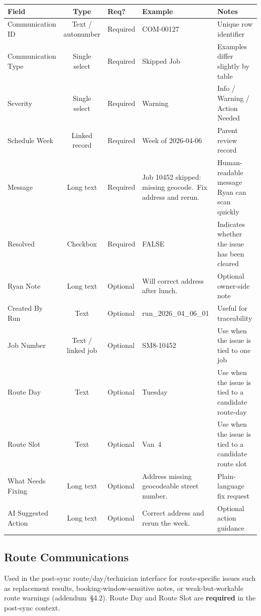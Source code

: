 \documentclass[12pt]{article}
\begin{document}
\medskip
{\small
\begin{longtable}{lclp{2.8cm}p{3.2cm}}
\toprule
\textbf{Field} & \textbf{Type} & \textbf{Req?} & \textbf{Example} & \textbf{Notes} \\
\midrule
Communication ID   & Text / autonumber & Required & COM-00127 & Unique row identifier \\
Communication Type & Single select    & Required & Skipped Job & Examples differ slightly by table \\
Severity           & Single select    & Required & Warning & Info / Warning / Action Needed \\
Schedule Week      & Linked record    & Required & Week of 2026-04-06 & Parent review record \\
Message            & Long text & Required & Job 10452 skipped: missing geocode.\ Fix address and rerun. & Human-readable message Ryan can scan quickly \\
Resolved           & Checkbox  & Required & FALSE & Indicates whether the issue has been cleared \\
Ryan Note          & Long text & Optional & Will correct address after lunch. & Optional owner-side note \\
Created By Run     & Text      & Optional & run\_2026\_04\_06\_01 & Useful for traceability \\
Job Number         & Text / linked job & Optional & SM8-10452 & Use when the issue is tied to one job \\
Route Day          & Text      & Optional & Tuesday & Use when the issue is tied to a candidate route-day \\
Route Slot         & Text      & Optional & Van~4 & Use when the issue is tied to a candidate route slot \\
What Needs Fixing  & Long text & Optional & Address missing geocodeable street number. & Plain-language fix request \\
AI Suggested Action & Long text & Optional & Correct address and rerun the week. & Optional action guidance \\
\bottomrule
\end{longtable}
}

\subsection*{Route Communications}

Used in the post-sync route/day/technician interface for route-specific issues such as replacement results, booking-window-sensitive notes, or weak-but-workable route warnings (addendum~\S4.2).
Route Day and Route Slot are \textbf{required} in the post-sync context.
\end{document}
